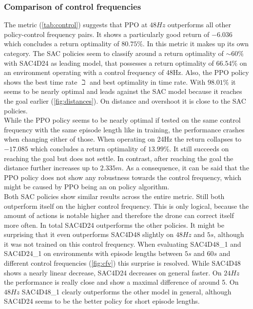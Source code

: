 
\newpage




\subsubsection{Comparison of control frequencies}
The metric (\cref{tab:control}) suggests that PPO at $48Hz$ outperforms all other policy-control frequency pairs. 
It shows a particularly good return of $-6.036$ which concludes a return optimality of $80.75 \%$. 
In this metric it makes up its own category. 
The SAC policies seem to classify around a return optimality of $\sim 60 \%$ with SAC4D24 as leading model, 
that possesses a return optimality of $66.54 \%$ on an environment operating with a control frequency of 48Hz. 
Also, the PPO policy shows the best time rate $\beth$ and best optimality in time rate. 
With $98.01 \%$ it seems to be nearly optimal and leads against the SAC model because it reaches the goal earlier (\cref{fig:distances}). 
On distance and overshoot it is close to the SAC policies.\\
While the PPO policy seems to be nearly optimal if tested on the same control frequency with the same episode length like in training, 
the performance crashes when changing either of those. 
When operating on 24Hz the return collapses to $-17.085$ which concludes a return optimality of $13.99 \%$.
It still succeeds on reaching the goal but does not settle. In contrast, after reaching the goal the distance further increases up to $2.335m$. 
As a consequence, it can be said that the PPO policy does not show any robustness towards the control frequency, 
which might be caused by PPO being an on policy algorithm.\\
Both SAC policies show similar results across the entire metric. 
Still both outperform itself on the higher control frequency. 
This is only logical, because the amount of actions is notable higher and therefore the drone can correct itself more often. 
In total SAC4D24 outperforms the other policies. It might be surprising that it even outperforms
 SAC4D48 slightly on $48Hz$ and $5s$, although it was not trained on this control frequency.  
When evaluating SAC4D48\_1 and SAC4D24\_1 on environments with episode lengths between $5s$ and $60s$ and different control
 frequencies (\cref{fig:cfv}) this surprise is resolved. While SAC4D48 shows a nearly linear decrease, SAC4D24 decreases on general faster. 
 On $24Hz$ the performance is really close and show a maximal difference of around 5. 
 On $48Hz$ SAC4D48\_1 clearly outperforms the other model in general, although SAC4D24 seems to be the better policy for short episode lengths.

